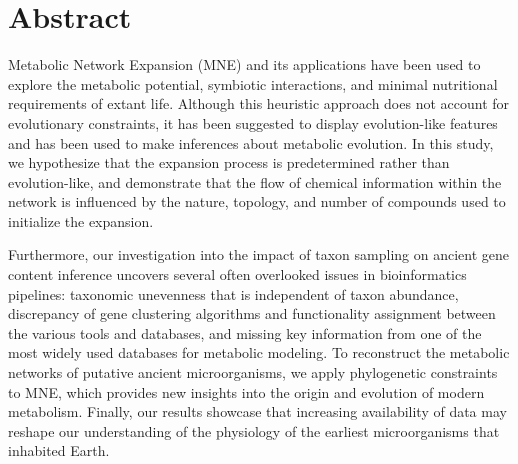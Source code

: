 \newpage
\thispagestyle{empty}
\section*{\textbf{Abstract}}

\large 

Metabolic Network Expansion (MNE) and its applications have been used to explore the metabolic potential, symbiotic interactions, and minimal nutritional requirements of extant life. Although this heuristic approach does not account for evolutionary constraints, it has been suggested to display evolution-like features and has been used to make inferences about metabolic evolution. In this study, we hypothesize that the expansion process is predetermined rather than evolution-like, and demonstrate that the flow of chemical information within the network is influenced by the nature, topology, and number of compounds used to initialize the expansion. 

Furthermore, our investigation into the impact of taxon sampling on ancient gene content inference uncovers several often overlooked issues in bioinformatics pipelines: taxonomic unevenness that is independent of taxon abundance, discrepancy of gene clustering algorithms and functionality assignment between the various tools and databases, and missing key information from one of the most widely used databases for metabolic modeling. To reconstruct the metabolic networks of putative ancient microorganisms, we apply phylogenetic constraints to MNE, which provides new insights into the origin and evolution of modern metabolism. Finally, our results showcase that increasing availability of data may reshape our understanding of the physiology of the earliest microorganisms that inhabited Earth.